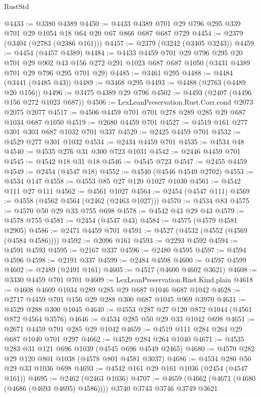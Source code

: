 \begin{lexlean}{RustStd}
\begin{coremodule}
@4433 := @3380 @4389
@4450 := @4433 @4389 @701 @29 @796 @295 @339 @701 @29 @1054 @18 @64 @20 @67 @866 @687 @687 @729
@4454 := @2379 (@3404 (@2783 (@2386 @161)))
@4457 := @2379 (@3242 (@3405 @3243))
@4459 := @4454 (@4457 @4389)
@4484 := @4433
    @4459
    @701
    @29
    @796
    @295
    @20
    @701
    @29
    @902
    @43
    @156
    @272
    @291
    @1023
    @687
    @687
    @1050
    (@3431 @4389 @701 @29 @796 @295 @701 @29)
@4485 := @3461 @295
@4488 := @4484 (@3441 (@4485 @43))
@4489 := @3468 @295
@4493 := @4488 (@2763 (@4489 @20 @156))
@4496 := @3475 @4389 @29 @796
@4502 := @4493 (@2407 (@4496 @156 @272 @1023 @687))
@4506 := LexLeanPreservation.Rust.Corr.cond @2073 @2075 @2077
@4517 := @4506 @4459 @701 @701 @278 @289 @285 @29 @687 @1034 @687 @1050
@4519 := @2680 @4459 @701
@4527 := @4519 @161 @277 @301 @303 @687 @1032 @701 @337
@4529 := @2425 @4459 @701
@4532 := @4529 @277 @301 @1032
@4534 := @2434 @4459 @701
@4535 := @4534 @48
@4540 := @4535 @276 @31 @300 @723 @1031
@4542 := @2446 @4459 @701
@4545 := @4542 @18 @31 @18
@4546 := @4545 @723
@4547 := @2455 @4459
@4549 := @2454 (@4547 @18)
@4552 := @4540 (@4546 @4549 @2702)
@4553 := @4534 @147
@4558 := @4553 @85 @27 @120 @1027 @1030
@4561 := @4542 @111 @27 @111
@4562 := @4561 @1027
@4564 := @2454 (@4547 @111)
@4569 := @4558 (@4562 @4564 (@2462 (@2463 @1027)))
@4570 := @4534 @83
@4575 := @4570 @50 @29 @33 @755 @698
@4578 := @4542 @43 @29 @43
@4579 := @4578 @755
@4581 := @2454 (@4547 @43)
@4584 := @4575 (@4579 @4581 @2905)
@4586 := @2471 @4459 @701
@4591 := @4527 (@4532 (@4552 (@4569 (@4584 @4586))))
@4592 := @2096 @161
@4593 := @2293 @4592
@4594 := @4591 @4593
@4595 := @2167 @337
@4596 := @2480 @4595
@4597 := @4594 @4596
@4598 := @2191 @337
@4599 := @2484 @4598
@4600 := @4597 @4599
@4602 := @2489 (@2491 @161)
@4605 := @4517 (@4600 @4602 @3621)
@4608 := @3330 @4459 @701 @701
@4609 := LexLeanPreservation.Rust.Kind.plain
@4618 := @4608 @4609 @1034 @289 @285 @29 @687 @1046 @687 @1042
@4628 := @2717 @4459 @701 @156 @29 @288 @300 @687 @1045 @969 @3970
@4631 := @4529 @288 @300 @1045
@4640 := @4553 @287 @27 @120 @872 @1044 (@4561 @872 @4564 @3576)
@4646 := @4534 @285 @50 @29 @33 @1042 @698
@4651 := @2671 @4459 @701 @285 @29 @1042
@4659 := @4519 @111 @284 @264 @29 @687 @1040 @701 @297
@4662 := @4529 @284 @264 @1040
@4671 := @4535 @283 @31 @121 @696 @1039 (@4545 @696 @4549 @2465)
@4680 := @4570 @282 @29 @120 @801 @1038 (@4578 @801 @4581 @3037)
@4686 := @4534 @280 @50 @29 @33 @1036 @698
@4693 := @4542 @161 @29 @161 @1036 (@2454 (@4547 @161))
@4695 := @2462 (@2463 @1036)
@4707 := @4659 (@4662 (@4671 (@4680 (@4686 (@4693 @4695) @4586)))) @3740 @3743 @3746 @3749 @3621

\end{coremodule}
\end{lexlean}
